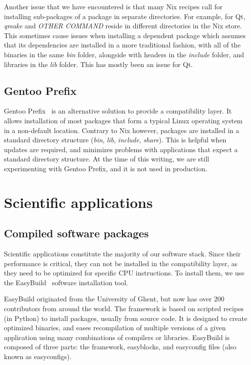 \documentclass[sigconf]{acmart}
\begin{document}
Another issue that we have encountered is that many Nix recipes call for installing sub-packages of a package in separate directories. For example, for Qt, {\it qmake} and {\it OTHER COMMAND} reside in different directories in the Nix store. This sometimes cause issues when installing a dependent package which assumes that its dependencies are installed in a more traditional fashion, with all of the binaries in the same {\it bin} folder, alongside with headers in the {\it include} folder, and libraries in the {\it lib} folder. This has mostly been an issue for Qt. 


\subsection{Gentoo Prefix}
\label{sub:Gentoo_Prefix}
Gentoo Prefix~\cite{Gentoo} is an alternative solution to provide a compatibility layer. It allows installation of most packages that form a typical Linux operating system in a non-default location. Contrary to Nix however, packages are installed in a standard directory structure ({\it bin}, {\it lib}, {\it include}, {\it share}). This is helpful when updates are required, and minimizes problems with applications that expect a standard directory structure. At the time of this writing, we are still experimenting with Gentoo Prefix, and it is not used in production. 

\section{Scientific applications}
\label{sec:Scientific_applications}

\subsection{Compiled software packages}
\label{sub:Compiled_software_packages}
Scientific applications constitute the majority of our software stack. Since their performance is critical, they can not be installed in the compatibility layer, as they need to be optimized for specific CPU instructions. To install them, we use the EasyBuild~\cite{EasyBuild2012,EasyBuild2014,EasyBuild2016} software installation tool.

EasyBuild originated from the University of Ghent, but now has over 200 contributors from around the world. The framework is based on scripted recipes (in Python) to install packages, usually from source code. It is designed to create optimized binaries, and eases recompilation of multiple versions of a given application using many combinations of compilers or libraries. EasyBuild is composed of three parts: the framework, easyblocks, and easyconfig files (also known as easyconfigs). 
\end{document}
